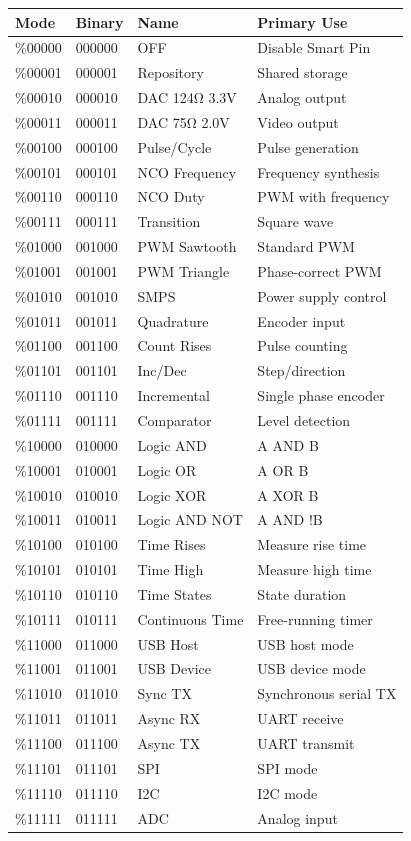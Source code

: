 \documentclass[11pt,a4paper,oneside,english]{book}
\begin{document}
\begin{longtable}[]{@{}llll@{}}
\toprule
Mode & Binary & Name & Primary Use \\
\midrule
\endhead
\%00000 & 000000 & OFF & Disable Smart Pin \\
\%00001 & 000001 & Repository & Shared storage \\
\%00010 & 000010 & DAC 124Ω 3.3V & Analog output \\
\%00011 & 000011 & DAC 75Ω 2.0V & Video output \\
\%00100 & 000100 & Pulse/Cycle & Pulse generation \\
\%00101 & 000101 & NCO Frequency & Frequency synthesis \\
\%00110 & 000110 & NCO Duty & PWM with frequency \\
\%00111 & 000111 & Transition & Square wave \\
\%01000 & 001000 & PWM Sawtooth & Standard PWM \\
\%01001 & 001001 & PWM Triangle & Phase-correct PWM \\
\%01010 & 001010 & SMPS & Power supply control \\
\%01011 & 001011 & Quadrature & Encoder input \\
\%01100 & 001100 & Count Rises & Pulse counting \\
\%01101 & 001101 & Inc/Dec & Step/direction \\
\%01110 & 001110 & Incremental & Single phase encoder \\
\%01111 & 001111 & Comparator & Level detection \\
\%10000 & 010000 & Logic AND & A AND B \\
\%10001 & 010001 & Logic OR & A OR B \\
\%10010 & 010010 & Logic XOR & A XOR B \\
\%10011 & 010011 & Logic AND NOT & A AND !B \\
\%10100 & 010100 & Time Rises & Measure rise time \\
\%10101 & 010101 & Time High & Measure high time \\
\%10110 & 010110 & Time States & State duration \\
\%10111 & 010111 & Continuous Time & Free-running timer \\
\%11000 & 011000 & USB Host & USB host mode \\
\%11001 & 011001 & USB Device & USB device mode \\
\%11010 & 011010 & Sync TX & Synchronous serial TX \\
\%11011 & 011011 & Async RX & UART receive \\
\%11100 & 011100 & Async TX & UART transmit \\
\%11101 & 011101 & SPI & SPI mode \\
\%11110 & 011110 & I2C & I2C mode \\
\%11111 & 011111 & ADC & Analog input \\
\bottomrule
\end{longtable}
\end{document}
